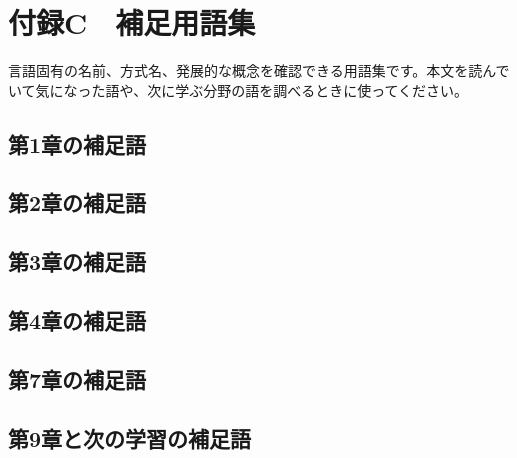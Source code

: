 \chapter{付録C　補足用語集}

言語固有の名前、方式名、発展的な概念を確認できる用語集です。本文を読んでいて気になった語や、次に学ぶ分野の語を調べるときに使ってください。

\section{第1章の補足語}
\ChapterOneSupplementalTerms

\section{第2章の補足語}
\ChapterTwoSupplementalTerms

\section{第3章の補足語}
\ChapterThreeSupplementalTerms

\section{第4章の補足語}
\ChapterFourSupplementalTerms

\section{第7章の補足語}
\ChapterSevenSupplementalTerms

\section{第9章と次の学習の補足語}
\ChapterNineSupplementalTerms
